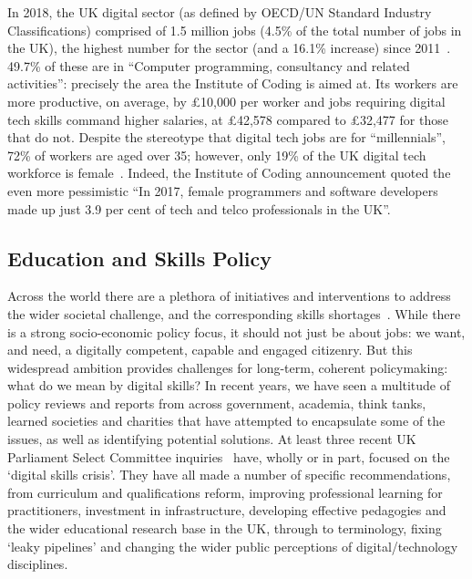 \documentclass[conference]{IEEEtran}
\begin{document}

In 2018, the UK digital sector (as defined by OECD/UN Standard Industry Classifications) comprised of 1.5 million jobs (4.5\% of
the total number of jobs in the UK), the highest number for the sector
(and a 16.1\% increase) since 2011~\cite{dcms:2018}. 49.7\% of these are in ``Computer programming, consultancy and related activities'': precisely the area the Institute of Coding is aimed at. Its workers are
more productive, on average, by \pounds10,000 per worker and jobs
requiring digital tech skills command higher salaries, at
\pounds42,578 compared to \pounds32,477 for those that do not. Despite
the stereotype that digital tech jobs are for ``millennials'', 72\% of
workers are aged over 35; however, only 19\% of the UK digital tech
workforce is female~\cite{technation:2018}. Indeed, the Institute of
Coding announcement \cite{DfE2018a} quoted the even more pessimistic
``In 2017, female programmers and software developers made up just 3.9
per cent of tech and telco professionals in the UK''.

\subsection{Education and Skills Policy}

Across the world there are a plethora of initiatives and interventions
to address the wider societal challenge, and the corresponding skills
shortages~\cite{cece:2017}. While there is a strong socio-economic
policy focus, it should not just be about jobs: we want, and need, a
digitally competent, capable and engaged citizenry. But this
widespread ambition provides challenges for long-term, coherent
policymaking: what do we mean by digital skills? In recent years, we
have seen a multitude of policy reviews and reports from across
government, academia, think tanks, learned societies and charities
that have attempted to encapsulate some of the issues, as well as
identifying potential solutions. At least three recent UK Parliament
Select Committee
inquiries~\cite{ukholds:2015,ukhocst:2016,ukholc:2017} have, wholly or
in part, focused on the `digital skills crisis'. They have all made a
number of specific recommendations, from curriculum and qualifications
reform, improving professional learning for practitioners, investment
in infrastructure, developing effective pedagogies and the wider
educational research base in the UK, through to terminology, fixing
`leaky pipelines' and changing the wider public perceptions of
digital/technology disciplines.
\end{document}

